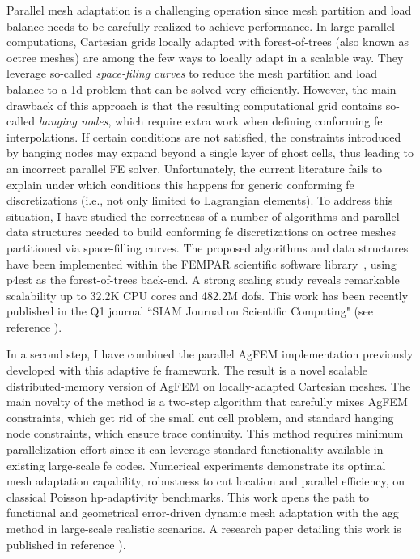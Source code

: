 \documentclass{article}
\begin{document}
 Parallel mesh adaptation is a challenging operation since mesh partition and load balance needs to be carefully realized to achieve performance.  In large parallel computations, Cartesian grids locally adapted with forest-of-trees (also known as octree meshes) are among the few ways to locally adapt in a scalable way. They leverage so-called \emph{space-filing curves} \cite{Holke2018} to reduce the mesh partition and load balance to a 1d problem that can be solved very efficiently. However, the main drawback of this approach is that the resulting computational grid contains so-called \emph{hanging nodes}, which require extra work when defining conforming \ac{fe} interpolations. If certain conditions are not satisfied, the constraints introduced by hanging nodes may expand beyond a single layer of ghost cells, thus leading to an incorrect parallel FE solver. Unfortunately, the current literature fails to explain under which conditions this happens for generic conforming \ac{fe} discretizations (i.e., not only limited to Lagrangian elements). To address this situation, I have studied the correctness of a number of algorithms and parallel data structures needed to build conforming \ac{fe} discretizations on octree meshes partitioned via space-filling curves.  The proposed algorithms and data structures have been implemented within the FEMPAR scientific software library~\cite{badia_fempar:_2017}, using p4est \cite{Bangerth2007} as the forest-of-trees back-end. A strong scaling study reveals remarkable scalability up to 32.2K CPU cores and 482.2M \acp{dof}. {This work has been recently published in the Q1 journal ``SIAM Journal on Scientific Computing"} (see reference \cite{Badia2019a} ).

 In a second step, I have combined the parallel AgFEM implementation previously developed with this adaptive \ac{fe} framework. The result is a novel scalable distributed-memory version of AgFEM on locally-adapted Cartesian meshes. The main novelty of the method is a two-step algorithm that carefully mixes AgFEM constraints, which get rid of the small cut cell problem, and standard hanging node constraints, which ensure trace continuity. This method requires minimum parallelization effort since it can leverage standard functionality available in existing large-scale \ac{fe} codes. Numerical experiments demonstrate its optimal mesh adaptation capability, robustness to cut location and parallel efficiency, on classical Poisson hp-adaptivity benchmarks. This work opens the path to functional and geometrical error-driven dynamic mesh adaptation with the \ac{agg} method in large-scale realistic scenarios. A research paper detailing this work is published in reference \cite{Badia2020a}).
\end{document}
